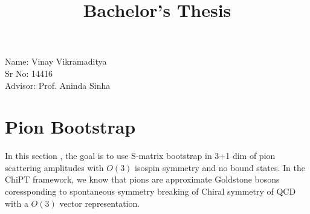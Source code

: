 ﻿\documentclass[12pt,a4paper]{article}
\begin{document}
\title{Bachelor's Thesis}
\date{}
\maketitle
\small{Name: Vinay Vikramaditya}\\

\small{Sr No: 14416}\\

\small{Advisor: Prof. Aninda Sinha}\\



\newpage
\tableofcontents
\newpage






\section{Pion Bootstrap}
In this section \cite{2}, the goal is to use S-matrix bootstrap in 3+1 dim of pion scattering amplitudes with $O(3)$ isospin symmetry and no bound states. In the ChiPT framework, we know that pions are approximate Goldstone bosons coressponding to spontaneous symmetry breaking of Chiral symmetry of QCD with a $O(3)$ vector representation.
\end{document}

